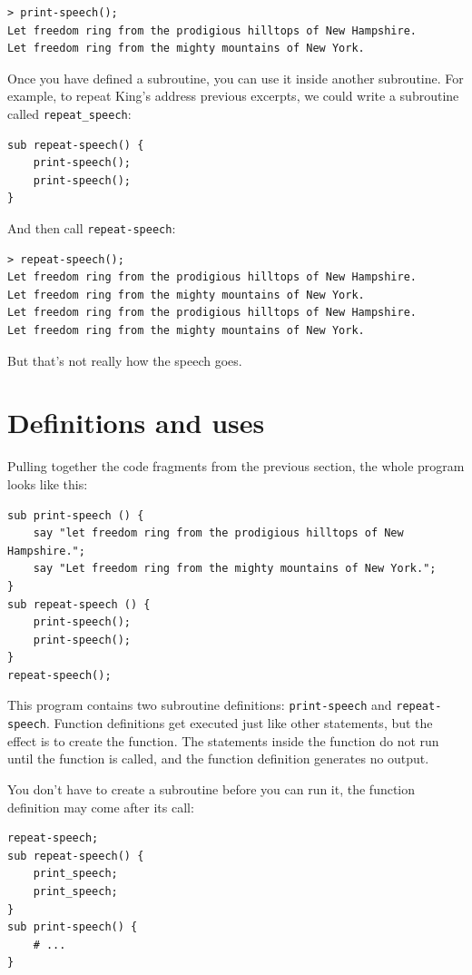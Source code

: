 \begin{verbatim}
> print-speech();
Let freedom ring from the prodigious hilltops of New Hampshire.
Let freedom ring from the mighty mountains of New York.
\end{verbatim}
%

Once you have defined a subroutine, you can use it inside another
subroutine.  For example, to repeat King's address previous 
excerpts,  we could write a subroutine called \verb"repeat_speech":

\begin{verbatim}
sub repeat-speech() {
    print-speech();
    print-speech();
}
\end{verbatim}
%
And then call \verb"repeat-speech":

\begin{verbatim}
> repeat-speech();
Let freedom ring from the prodigious hilltops of New Hampshire.
Let freedom ring from the mighty mountains of New York.
Let freedom ring from the prodigious hilltops of New Hampshire.
Let freedom ring from the mighty mountains of New York.
\end{verbatim}
%
But that's not really how the speech goes.


\section{Definitions and uses}

Pulling together the code fragments from the previous section, the
whole program looks like this:

\begin{verbatim}
sub print-speech () {
    say "let freedom ring from the prodigious hilltops of New Hampshire.";
    say "Let freedom ring from the mighty mountains of New York.";
}
sub repeat-speech () {
    print-speech();
    print-speech();
}
repeat-speech();
\end{verbatim}
%
This program contains two subroutine definitions: \verb"print-speech" and
\verb"repeat-speech".  Function definitions get executed just like other
statements, but the effect is to create the function.  The statements
inside the function do not run until the function is called, and
the function definition generates no output.

You don't have to create a subroutine before you can run it, 
the function definition may come after its call:
\begin{verbatim}
repeat-speech;
sub repeat-speech() {
    print_speech;
    print_speech;
}
sub print-speech() {
    # ...
}
\end{verbatim}


